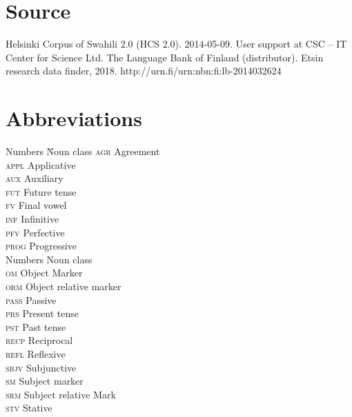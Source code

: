 \documentclass[output=paper,colorlinks,citecolor=brown]{langscibook}
\begin{document}
\section*{Source}

Helsinki Corpus of Swahili 2.0 (HCS 2.0). 2014-05-09. User support at CSC -- IT Center for Science Ltd. The Language Bank of Finland (distributor). Etsin research data finder, 2018. http://urn.fi/urn:nbn:fi:lb-2014032624

\section*{Abbreviations}
\begin{multicols}{2}
\begin{tabbing}
Numbers  \hspace{1ex} \= Noun class   \kill
\textsc{agr}   \> Agreement    \\ 
\textsc{appl}  \> Applicative  \\ 
\textsc{aux}   \> Auxiliary    \\ 
\textsc{fut}   \> Future tense \\ 
\textsc{fv}    \> Final vowel  \\ 
\textsc{inf}   \> Infinitive   \\ 
\textsc{pfv}   \> Perfective   \\ 
\textsc{prog}  \> Progressive  \\ 
Numbers        \> Noun class   \\ 
\textsc{om}    \> Object Marker\\ 
\textsc{orm}   \> Object relative marker\\
\textsc{pass}  \> Passive\\
\textsc{prs}   \> Present tense\\
\textsc{pst}   \> Past tense\\
\textsc{recp}  \> Reciprocal\\
\textsc{refl}  \> Reflexive\\
\textsc{sbjv}  \> Subjunctive\\
\textsc{sm}    \> Subject marker\\
\textsc{srm}   \> Subject relative Mark\\
\textsc{stv}   \> Stative
\end{tabbing}
\end{multicols}

{\sloppy\printbibliography[heading=subbibliography,notkeyword=this]}
\end{document}
